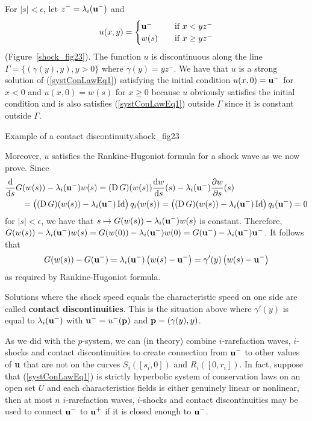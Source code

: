 For $|s| < \epsilon$, let $\displaystyle z^- = \lambda_i(\VEC{u}^-)$ and
\[
u(x,y) = \begin{cases} \VEC{u}^- & \quad \text{if} \ x < y z^- \\
w(s) & \quad \text{if} \ x \geq y z^-
\end{cases}
\]
(Figure~\ref{shock_fig23}).
The function $u$ is discontinuous along the line
$\Gamma = \{ (\gamma(y),y), y >0\}$ where
$\displaystyle \gamma(y) = y z^-$.
We have that $u$ is a strong solution of (\ref{systConLawEq1})
satisfying the initial condition
$u(x,0) = \VEC{u}^-$ for $x<0$ and $u(x,0) = w(s)$ for $x \geq 0$
because $u$ obviously satisfies the initial condition and is also satisfies
(\ref{systConLawEq1}) outside $\Gamma$ since it is constant outside
$\Gamma$.

{Example of a contact discontinuity.}{shock_fig23}

Moreover, $u$ satisfies the Rankine-Hugoniot formula for a shock
wave as we now prove.  Since
\begin{align*}
&\dfdx{G(w(s)) - \lambda_i(\VEC{u}^-) w(s)}{s}
= (\diff G)(w(s)) \dydx{w}{s}(s) - \lambda_i(\VEC{u}^-) \pdydx{w}{s}(s) \\
&\qquad = \left( (\diff G)(w(s)) - \lambda_i(\VEC{u}^-) \Id \right) q_i(w(s))
= \left( (\diff G)(w(s)) - \lambda_i(\VEC{u}^-) \Id \right) q_i(\VEC{u}^-)
= 0
\end{align*}
for $|s|<\epsilon$, we have that
$\displaystyle s \mapsto G(w(s)) - \lambda_i(\VEC{u}^-) w(s)$
is constant.  Therefore,
$\displaystyle G(w(s)) - \lambda_i(\VEC{u}^-) w(s)
=  G(w(0)) - \lambda_i(\VEC{u}^-) w(0)
= G(\VEC{u}^-) - \lambda_i(\VEC{u}^-) \VEC{u}^-$.  It follows that
\[
G(w(s)) - G(\VEC{u}^-)
= \lambda_i(\VEC{u}^-) \left( w(s) - \VEC{u}^-\right)
= \gamma'(y) \left( w(s) - \VEC{u}^-\right)
\]
as required by Rankine-Hugoniot formula.

Solutions where the shock speed equals the characteristic speed on one
side are called {\bfseries contact discontinuities}.  This is the situation above where
$\gamma'(y)$  is equal to $\displaystyle \lambda_i(\VEC{u}^-)$ with
$\displaystyle \VEC{u}^- = u^-(\VEC{p})$ and $\VEC{p} = (\gamma(y),y)$.

As we did with the $p$-system, we can (in theory) combine
$i$-rarefaction waves, $i$-shocks and contact discontinuities to
create connection from $\displaystyle \VEC{u}^-$ to other values of
$\VEC{u}$ that are not on the curves $S_i([s_i,0])$ and $R_i([0,r_i])$.
In fact, suppose that (\ref{systConLawEq1}) is strictly hyperbolic
system of conservation laws on an open set $U$ and each characteristics
fields is either genuinely linear or nonlinear, then at most
$n$ $i$-rarefaction waves, $i$-shocks and contact discontinuities
may be used to connect $\displaystyle \VEC{u}^-$ to 
$\displaystyle \VEC{u}^+$ if it is closed enough to $\displaystyle \VEC{u}^-$.


